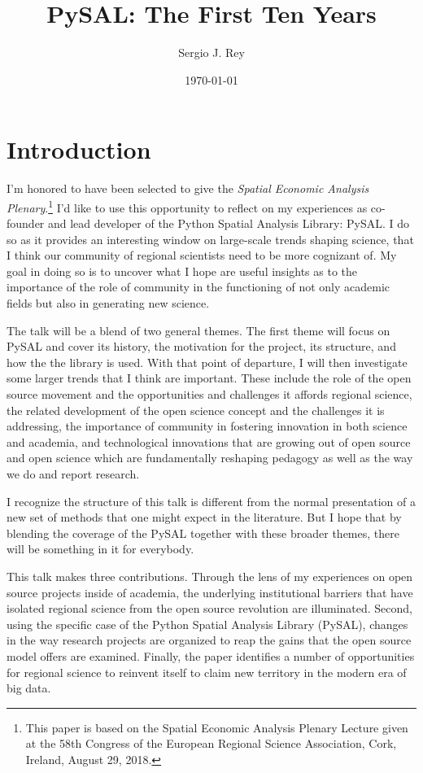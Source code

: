 \documentclass[11pt]{article}
\author{Sergio J. Rey}
\date{\today}
\title{PySAL: The First Ten Years}
\begin{document}
\maketitle
\section*{Introduction}
\label{sec:org8a5fc20}

I'm honored to have been selected to give the \emph{Spatial Economic Analysis
Plenary}.\footnote{This paper is based on the Spatial Economic Analysis Plenary Lecture
given at the 58th Congress of the European Regional Science Association, Cork,
Ireland, August 29, 2018.} I'd like to use this opportunity to reflect on my experiences as
co-founder and lead developer of the Python Spatial Analysis Library: PySAL. I
do so as it provides an interesting window on large-scale trends shaping
science, that I think our community of regional scientists need to be more
cognizant of. My goal in doing so is to uncover what I hope are useful insights
as to the importance of the role of community in the functioning of not only
academic fields but also in generating new science.


The talk will be a blend of two general themes. The first theme will focus on
PySAL and cover its history, the motivation for the project, its structure, and
how the the library is used. With that point of departure, I will then
investigate some  larger trends that I think are important. These
include the role of the open source movement and the opportunities and
challenges it affords regional science, the related development of the open
science concept and the challenges it is addressing, the importance of
community in fostering innovation in both science and academia, and
technological innovations that are growing out of open source and open science
which are fundamentally reshaping pedagogy as well as the way we do and report
research.

I recognize the structure of this talk is different from the normal
presentation of a new set of methods that one might expect in the literature.
But I hope that by blending the coverage of the PySAL together with these
broader themes, there will be something in it for everybody.

This talk makes three contributions. Through the lens of my
experiences on open source projects inside of academia, the underlying
institutional barriers that have isolated regional science from the open source
revolution are illuminated. Second, using the specific case of the Python
Spatial Analysis Library (PySAL), changes in the way research projects are
organized to reap the gains that the open source model offers are examined.
Finally, the paper identifies a number of opportunities for regional science to
reinvent itself to claim new territory in the modern era of big data.
\end{document}
